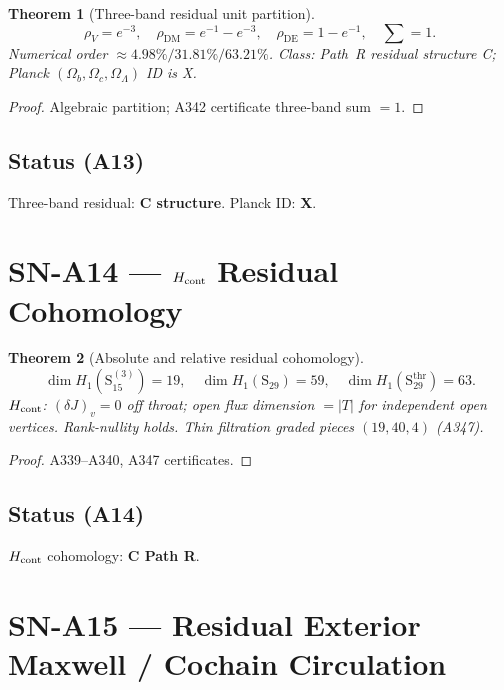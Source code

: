 \documentclass[11pt,a4paper]{article}
\newtheorem{theorem}{Theorem}[section]
\theoremstyle{definition}
\begin{document}
\begin{theorem}[Three-band residual unit partition]
\label{thm:A13}
\begin{equation}
\rho_V=e^{-3},\quad
\rho_{\mathrm{DM}}=e^{-1}-e^{-3},\quad
\rho_{\mathrm{DE}}=1-e^{-1},\quad
\sum=1.
\end{equation}
Numerical order $\approx 4.98\%/31.81\%/63.21\%$. Class: Path~R residual structure C;
Planck $(\Omega_b,\Omega_c,\Omega_\Lambda)$ ID is X.
\end{theorem}

\begin{proof}
Algebraic partition; A342 certificate three-band sum $=1$.
\end{proof}

\subsection*{Status (A13)} Three-band residual: \textbf{C structure}. Planck ID: \textbf{X}.

\section{SN-A14 --- $H_{\rm cont}$ Residual Cohomology}
\label{sec:SNA14}

\begin{theorem}[Absolute and relative residual cohomology]
\label{thm:A14}
\begin{equation}
\dim H_1(\mathrm{S}_{15}^{(3)})=19,\quad
\dim H_1(\mathrm{S}_{29})=59,\quad
\dim H_1(\mathrm{S}_{29}^{\mathrm{thr}})=63.
\end{equation}
$H_{\rm cont}$: $(\delta J)_v=0$ off throat; open flux dimension $=|T|$ for independent open vertices.
Rank-nullity holds. Thin filtration graded pieces $(19,40,4)$ (A347).
\end{theorem}

\begin{proof}
A339--A340, A347 certificates.
\end{proof}

\subsection*{Status (A14)} $H_{\rm cont}$ cohomology: \textbf{C Path R}.

\section{SN-A15 --- Residual Exterior Maxwell / Cochain Circulation}
\label{sec:SNA15}
\end{document}
